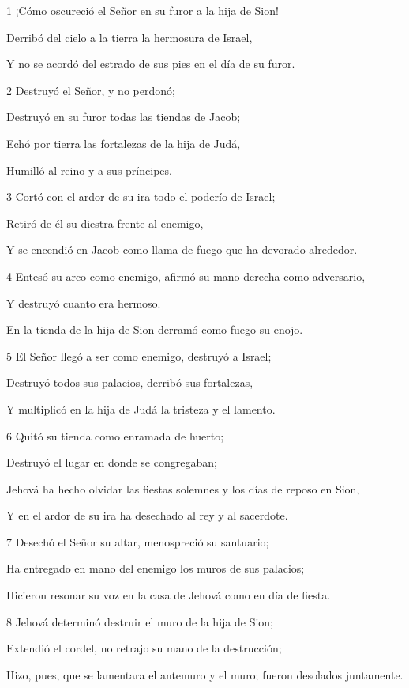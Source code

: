 \par 1 ¡Cómo oscureció el Señor en su furor a la hija de Sion!
\par Derribó del cielo a la tierra la hermosura de Israel,
\par Y no se acordó del estrado de sus pies en el día de su furor.
\par 2 Destruyó el Señor, y no perdonó;
\par Destruyó en su furor todas las tiendas de Jacob;
\par Echó por tierra las fortalezas de la hija de Judá, 
\par Humilló al reino y a sus príncipes.
\par 3 Cortó con el ardor de su ira todo el poderío de Israel;
\par Retiró de él su diestra frente al enemigo,
\par Y se encendió en Jacob como llama de fuego que ha devorado alrededor.
\par 4 Entesó su arco como enemigo, afirmó su mano derecha como adversario,
\par Y destruyó cuanto era hermoso.
\par En la tienda de la hija de Sion derramó como fuego su enojo.
\par 5 El Señor llegó a ser como enemigo, destruyó a Israel;
\par Destruyó todos sus palacios, derribó sus fortalezas,
\par Y multiplicó en la hija de Judá la tristeza y el lamento.
\par 6 Quitó su tienda como enramada de huerto; 
\par Destruyó el lugar en donde se congregaban;
\par Jehová ha hecho olvidar las fiestas solemnes y los días de reposo en Sion,
\par Y en el ardor de su ira ha desechado al rey y al sacerdote.
\par 7 Desechó el Señor su altar, menospreció su santuario;
\par Ha entregado en mano del enemigo los muros de sus palacios;
\par Hicieron resonar su voz en la casa de Jehová como en día de fiesta.
\par 8 Jehová determinó destruir el muro de la hija de Sion;
\par Extendió el cordel, no retrajo su mano de la destrucción;
\par Hizo, pues, que se lamentara el antemuro y el muro; fueron desolados juntamente.
